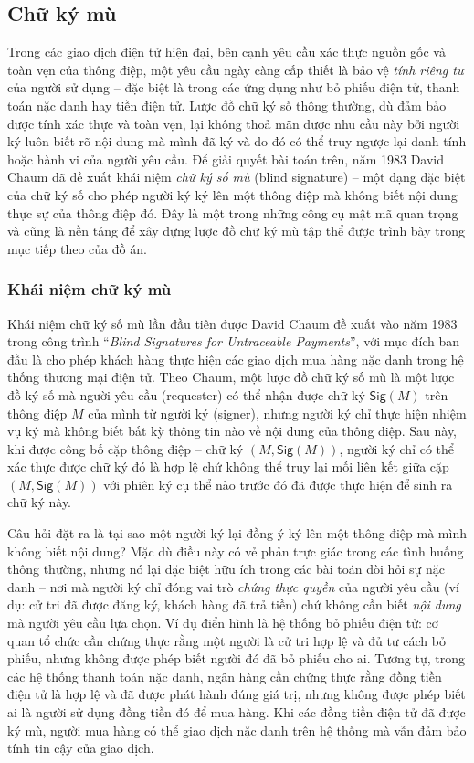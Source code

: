 \subsection{Chữ ký mù}

Trong các giao dịch điện tử hiện đại, bên cạnh yêu cầu xác thực nguồn gốc và toàn vẹn của thông điệp, một yêu cầu ngày càng cấp thiết là bảo vệ \textit{tính riêng tư} của người sử dụng -- đặc biệt là trong các ứng dụng như bỏ phiếu điện tử, thanh toán nặc danh hay tiền điện tử. Lược đồ chữ ký số thông thường, dù đảm bảo được tính xác thực và toàn vẹn, lại không thoả mãn được nhu cầu này bởi người ký luôn biết rõ nội dung mà mình đã ký và do đó có thể truy ngược lại danh tính hoặc hành vi của người yêu cầu. Để giải quyết bài toán trên, năm 1983 David Chaum đã đề xuất khái niệm \textit{chữ ký số mù} (blind signature) -- một dạng đặc biệt của chữ ký số cho phép người ký ký lên một thông điệp mà không biết nội dung thực sự của thông điệp đó. Đây là một trong những công cụ mật mã quan trọng và cũng là nền tảng để xây dựng lược đồ chữ ký mù tập thể được trình bày trong mục tiếp theo của đồ án.

\subsubsection{Khái niệm chữ ký mù}

Khái niệm chữ ký số mù lần đầu tiên được David Chaum đề xuất vào năm 1983 trong công trình ``\textit{Blind Signatures for Untraceable Payments}'', với mục đích ban đầu là cho phép khách hàng thực hiện các giao dịch mua hàng nặc danh trong hệ thống thương mại điện tử. Theo Chaum, một lược đồ chữ ký số mù là một lược đồ ký số mà người yêu cầu (requester) có thể nhận được chữ ký $\textsf{Sig}(M)$ trên thông điệp $M$ của mình từ người ký (signer), nhưng người ký chỉ thực hiện nhiệm vụ ký mà không biết bất kỳ thông tin nào về nội dung của thông điệp. Sau này, khi được công bố cặp thông điệp -- chữ ký $(M, \textsf{Sig}(M))$, người ký chỉ có thể xác thực được chữ ký đó là hợp lệ chứ không thể truy lại mối liên kết giữa cặp $(M, \textsf{Sig}(M))$ với phiên ký cụ thể nào trước đó đã được thực hiện để sinh ra chữ ký này.

Câu hỏi đặt ra là tại sao một người ký lại đồng ý ký lên một thông điệp mà mình không biết nội dung? Mặc dù điều này có vẻ phản trực giác trong các tình huống thông thường, nhưng nó lại đặc biệt hữu ích trong các bài toán đòi hỏi sự nặc danh -- nơi mà người ký chỉ đóng vai trò \textit{chứng thực quyền} của người yêu cầu (ví dụ: cử tri đã được đăng ký, khách hàng đã trả tiền) chứ không cần biết \textit{nội dung} mà người yêu cầu lựa chọn. Ví dụ điển hình là hệ thống bỏ phiếu điện tử: cơ quan tổ chức cần chứng thực rằng một người là cử tri hợp lệ và đủ tư cách bỏ phiếu, nhưng không được phép biết người đó đã bỏ phiếu cho ai. Tương tự, trong các hệ thống thanh toán nặc danh, ngân hàng cần chứng thực rằng đồng tiền điện tử là hợp lệ và đã được phát hành đúng giá trị, nhưng không được phép biết ai là người sử dụng đồng tiền đó để mua hàng. Khi các đồng tiền điện tử đã được ký mù, người mua hàng có thể giao dịch nặc danh trên hệ thống mà vẫn đảm bảo tính tin cậy của giao dịch.

